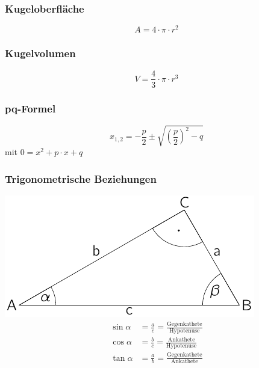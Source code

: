 
\subsubsection{Kugeloberfläche}
\begin{equation}\label{eq:mathematik:kreisflaeche}
 A = 4\cdot \pi \cdot r^2
\end{equation}

\subsubsection{Kugelvolumen}
\begin{equation}\label{eq:mathematik:kugelvolumen}
 V = \frac{4}{3}\cdot\pi\cdot r^3
\end{equation}

\subsubsection{pq-Formel}
\begin{equation}\label{eq:mathematik:quadratische:gleichung:pq}
x_{1,2} = - \frac{p}{2} \pm \sqrt{ \left(\frac{p}{2}\right)^2 - q }
\end{equation}
mit $ 0 = x^2 + p \cdot x + q $

\subsubsection{Trigonometrische Beziehungen}
\includegraphics[width=0.6\linewidth]{trigonometrie} \hfill
\begin{align}
\sin\alpha &= \frac{a}{c} = \frac{\text{Gegenkathete}}{\text{Hypotenuse}}\\
\cos\alpha &= \frac{b}{c} = \frac{\text{Ankathete}}{\text{Hypotenuse}}\\
\tan\alpha  &= \frac{a}{b} = \frac{\text{Gegenkathete}}{\text{Ankathete}}
\end{align}
